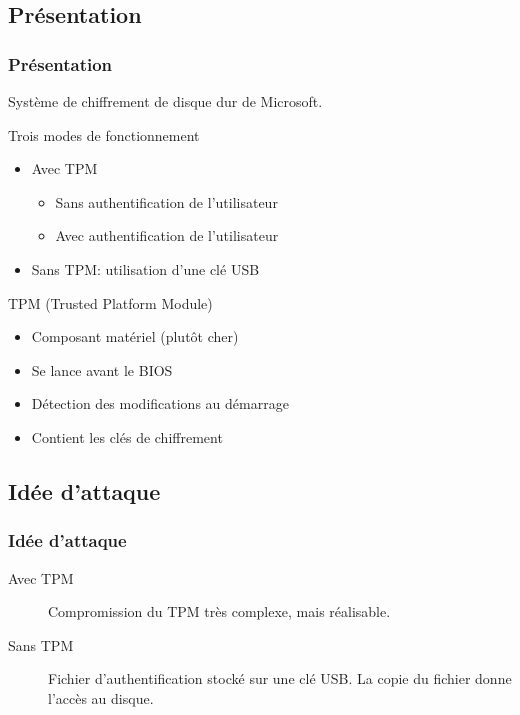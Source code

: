 \documentclass[red]{beamer}
\begin{document}
\subsection{Présentation}
\begin{frame}
    \frametitle{Présentation}
    Système de chiffrement de disque dur de Microsoft.
    \begin{block}{Trois modes de fonctionnement}
        \begin{itemize}
            \item Avec TPM
                \begin{itemize}
                    \item Sans authentification de l'utilisateur
                    \item Avec authentification de l'utilisateur
                \end{itemize}
            \item Sans TPM: utilisation d'une clé USB
        \end{itemize}
    \end{block}
    \begin{block}{TPM (Trusted Platform Module)}
        \begin{itemize}
            \item Composant matériel (plutôt cher)
            \item Se lance avant le BIOS
            \item Détection des modifications au démarrage
            \item Contient les clés de chiffrement
        \end{itemize}
    \end{block}
\end{frame}

\subsection{Idée d'attaque}
\begin{frame}
    \frametitle{Idée d'attaque}
    \begin{description}
        \item[Avec TPM] Compromission du TPM très complexe, mais réalisable.
        \item[Sans TPM] Fichier d'authentification stocké sur une clé USB. La copie du fichier donne l'accès au disque.
    \end{description}
\end{frame}
\end{document}
